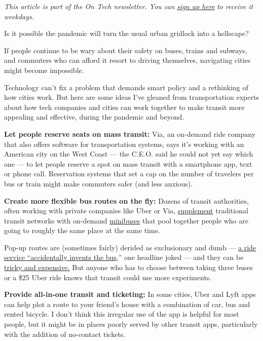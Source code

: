 \emph{This article is part of the On Tech newsletter. You can}
\href{https://www.nytimes.com/newsletters/signup/OT}{\emph{sign up
here}} \emph{to receive it weekdays.}

Is it possible the pandemic will turn the usual urban gridlock into a
hellscape?

If people continue to be wary about their safety on buses, trains and
subways, and commuters who can afford it resort to driving themselves,
navigating cities might become impossible.

Technology can't fix a problem that demands smart policy and a
rethinking of how cities work. But here are some ideas I've gleaned from
transportation experts about how tech companies and cities can work
together to make transit more appealing and effective, during the
pandemic and beyond.

\textbf{Let people reserve seats on mass transit:} Via, an on-demand
ride company that also offers software for transportation systems, says
it's working with an American city on the West Coast --- the C.E.O. said
he could not yet say which one --- to let people reserve a spot on mass
transit with a smartphone app, text or phone call. Reservation systems
that set a cap on the number of travelers per bus or train might make
commuters safer (and less anxious).

\textbf{Create more flexible bus routes on the fly:} Dozens of transit
authorities, often working with private companies like Uber or Via,
\href{https://www.viavan.com/berlin-launch/}{supplement} traditional
transit networks with on-demand
\href{https://www.theguardian.com/business/2018/jun/29/oxford-buses-turn-to-uber-style-apps-in-on-demand-experiment}{minibuses}
that pool together people who are going to roughly the same place at the
same time.

Pop-up routes are (sometimes fairly) derided as exclusionary and dumb
---
\href{https://www.shortlist.com/news/ride-sharing-company-lyft-has-invented-the-bus}{a
ride service ``accidentally invents the bus},'' one headline joked ---
and they can be
\href{https://www.wired.com/story/cities-on-demand-transit-buses/}{tricky
and expensive.} But anyone who has to choose between taking three buses
or a \$25 Uber ride knows that transit could use more experiments.

\textbf{Provide all-in-one transit and ticketing:} In some cities, Uber
and Lyft apps can help plot a route to your friend's house with a
combination of car, bus and rented bicycle. I don't think this irregular
use of the app is helpful for most people, but it might be in places
poorly served by other transit apps, particularly with the addition of
no-contact tickets.


